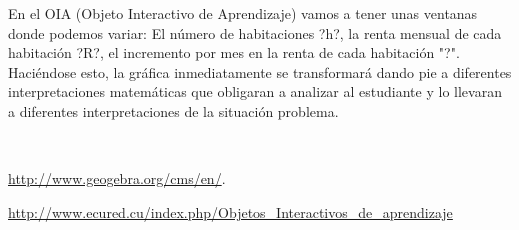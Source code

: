 \begin{titlepage}
\begin{minipage}{0.85\linewidth}
\begin{minipage}{0.85\linewidth}
\begin{resumen}
En el OIA  (Objeto Interactivo de Aprendizaje) vamos a tener unas ventanas donde podemos variar: El n\'umero de habitaciones ?h?, la renta mensual de cada habitaci\'on ?R?, el incremento por mes en la renta de cada habitaci\'on "?".  Haci\'endose esto, la gr\'afica inmediatamente se transformar\'a dando pie a diferentes interpretaciones matem\'aticas que obligaran a analizar al estudiante  y lo llevaran a diferentes interpretaciones de la situaci\'on problema.


    \end{resumen}
\end{minipage}
\vspace*{5pt}\\
\footnotesize
%  
    
\end{minipage}
\vspace{5pt}
\begin{thebibliography}{99}
 \url{http://www.geogebra.org/cms/en/}.

  \url{http://www.ecured.cu/index.php/Objetos_Interactivos_de_aprendizaje}

\end{thebibliography}
\end{titlepage}
